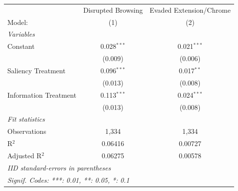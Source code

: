 \begin{tabular}{lcc}
   \tabularnewline \midrule \midrule
                         & Disrupted Browsing & Evaded Extension/Chrome \\   
   Model:                & (1)                & (2)\\  
   \midrule
   \emph{Variables}\\
   Constant              & 0.028$^{***}$      & 0.021$^{***}$\\   
                         & (0.009)            & (0.006)\\   
   Saliency Treatment    & 0.096$^{***}$      & 0.017$^{**}$\\   
                         & (0.013)            & (0.008)\\   
   Information Treatment & 0.113$^{***}$      & 0.024$^{***}$\\   
                         & (0.013)            & (0.008)\\   
   \midrule
   \emph{Fit statistics}\\
   Observations          & 1,334              & 1,334\\  
   R$^2$                 & 0.06416            & 0.00727\\  
   Adjusted R$^2$        & 0.06275            & 0.00578\\  
   \midrule \midrule
   \multicolumn{3}{l}{\emph{IID standard-errors in parentheses}}\\
   \multicolumn{3}{l}{\emph{Signif. Codes: ***: 0.01, **: 0.05, *: 0.1}}\\
\end{tabular}

